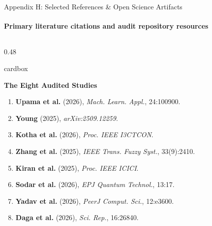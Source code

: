 \documentclass[aspectratio=169, 10pt]{beamer}
\newcommand{\cardbox}[3]{%
  \begin{beamercolorbox}[wd=\linewidth,rounded=true,sep=2.5pt]{cardbox}%
    {\bfseries\scriptsize\color{#1}#2\par}\vspace*{1pt}%
    {\footnotesize #3}%
  \end{beamercolorbox}%
}
\begin{document}
\begin{frame}{Appendix H: Selected References \& Open Science Artifacts}
  \framesubtitle{Primary literature citations and audit repository resources}

  \begin{columns}[T]
    \begin{column}{0.48\textwidth}
      \cardbox{DeepPurple}{The Eight Audited Studies}{
        \begin{enumerate}\setlength\itemsep{0.5pt}\tiny
          \item \textbf{Upama et al.} (2026), \textit{Mach. Learn. Appl.}, 24:100900.
          \item \textbf{Young} (2025), \textit{arXiv:2509.12259}.
          \item \textbf{Kotha et al.} (2026), \textit{Proc. IEEE I3CTCON}.
          \item \textbf{Zhang et al.} (2025), \textit{IEEE Trans. Fuzzy Syst.}, 33(9):2410.
          \item \textbf{Kiran et al.} (2025), \textit{Proc. IEEE ICICI}.
          \item \textbf{Sodar et al.} (2026), \textit{EPJ Quantum Technol.}, 13:17.
          \item \textbf{Yadav et al.} (2026), \textit{PeerJ Comput. Sci.}, 12:e3600.
          \item \textbf{Daga et al.} (2026), \textit{Sci. Rep.}, 16:26840.
        \end{enumerate}
      }
    \end{column}


\end{columns}
\end{frame}
\end{document}

